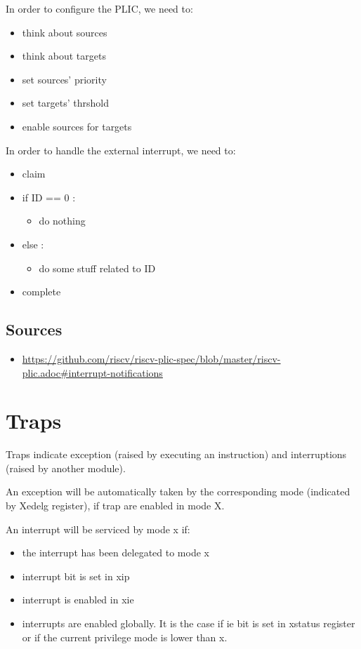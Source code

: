 \documentclass[10pt, a4paper]{article}
\begin{document}
In order to configure the PLIC, we need to:

\begin{itemize}
\item think about sources
\item think about targets
\item set sources' priority
\item set targets' thrshold
\item enable sources for targets
\end{itemize}

\noindent In order to handle the external interrupt, we need to:

\begin{itemize}
\item claim
\item if ID == 0 :
	\begin{itemize}
	\item do nothing
	\end{itemize}
\item else :
	\begin{itemize}
	\item do some stuff related to ID
	\end{itemize}
\item complete
\end{itemize}

\subsection{Sources}

\begin{itemize}
\item \href{https://github.com/riscv/riscv-plic-spec/blob/master/riscv-plic.adoc#interrupt-notification}{https://github.com/riscv/riscv-plic-spec/blob/master/riscv-plic.adoc\#interrupt-notifications}
\end{itemize}

\section{Traps}

Traps indicate exception (raised by executing an instruction) and interruptions (raised by another module).

An exception will be automatically taken by the corresponding mode (indicated by Xedelg register), if trap are enabled in mode X.

An interrupt will be serviced by mode x if:
\begin{itemize}
\item the interrupt has been delegated to mode x
\item interrupt bit is set in xip
\item interrupt is enabled in xie
\item interrupts are enabled globally. It is the case if ie bit is set in xstatus register or if the current privilege mode is lower than x.
\end{itemize}
\end{document}
